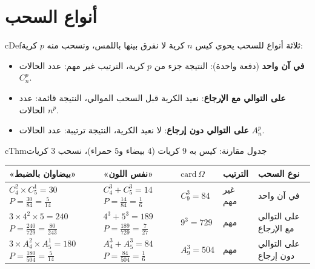 \documentclass[12pt,a4paper]{article}
\newenvironment{BOX}[2]{\begin{otherlanguage}{english}\begin{arbox}{#1}{#2}}{\end{arbox}\end{otherlanguage}}
\newenvironment{tarif}[1][تعريف]{\begin{BOX}{cDef}{#1}}{\end{BOX}}
\newenvironment{khassia}[1][خاصية]{\begin{BOX}{cThm}{#1}}{\end{BOX}}
\begin{document}
\section{أنواع السحب}
\begin{tarif}[ثلاثة أنواع للسحب]
يحوي كيس $n$ كرية لا نفرق بينها باللمس، ونسحب منه $p$ كرية:
\begin{itemize}
\item \textbf{في آن واحد} (دفعة واحدة): النتيجة جزء من $p$ كرية، الترتيب غير مهم: عدد الحالات $C_n^p$.
\item \textbf{على التوالي مع الإرجاع}: نعيد الكرية قبل السحب الموالي، النتيجة قائمة: عدد الحالات $n^p$.
\item \textbf{على التوالي دون إرجاع}: لا نعيد الكرية، النتيجة ترتيبة: عدد الحالات $A_n^p$.
\end{itemize}
\end{tarif}

\begin{khassia}[{جدول مقارنة: كيس به $9$ كريات ($4$ بيضاء و$5$ حمراء)، نسحب $3$ كريات}]
\begin{center}
\begin{tabular}{|p{}|p{}|p{}|p{}|p{}|}\hline
\rowcolor{cSec!12} \textbf{«بيضاوان بالضبط»} & \textbf{«نفس اللون»} & \textbf{$\mathrm{card}\,\Omega$} & \textbf{الترتيب} & \textbf{نوع السحب}\\\hline
$C_4^2\times C_5^1=30$ \newline $P=\frac{30}{84}=\frac{5}{14}$ & $C_4^3+C_5^3=14$ \newline $P=\frac{14}{84}=\frac16$ & $C_9^3=84$ & غير مهم & في آن واحد\\\hline
$3\times 4^2\times 5=240$ \newline $P=\frac{240}{729}=\frac{80}{243}$ & $4^3+5^3=189$ \newline $P=\frac{189}{729}=\frac{7}{27}$ & $9^3=729$ & مهم & على التوالي مع الإرجاع\\\hline
$3\times A_4^2\times A_5^1=180$ \newline $P=\frac{180}{504}=\frac{5}{14}$ & $A_4^3+A_5^3=84$ \newline $P=\frac{84}{504}=\frac16$ & $A_9^3=504$ & مهم & على التوالي دون إرجاع\\\hline
\end{tabular}
\end{center}
\end{khassia}
\end{document}
